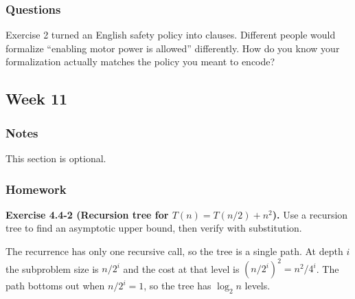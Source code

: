 \documentclass{article}
\theoremstyle{theorem}
\theoremstyle{definition}
\theoremstyle{remark}
\begin{document}
\subsubsection{Questions}

Exercise 2 turned an English safety policy into clauses. Different people would formalize ``enabling motor power is allowed'' differently. How do you know your formalization actually matches the policy you meant to encode?






















































\subsection{Week 11}

\subsubsection{Notes}

This section is optional. 

\subsubsection{Homework}

\textbf{Exercise 4.4-2 (Recursion tree for $T(n) = T(n/2) + n^2$).}
Use a recursion tree to find an asymptotic upper bound, then verify with substitution.

The recurrence has only one recursive call, so the tree is a single path. At depth $i$ the subproblem size is $n/2^i$ and the cost at that level is $(n/2^i)^2 = n^2/4^i$. The path bottoms out when $n/2^i = 1$, so the tree has $\log_2 n$ levels.
\end{document}
